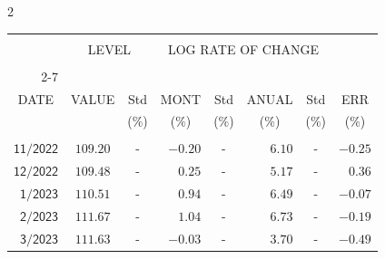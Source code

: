 \begin{multicols}{2}{ 
\begin{tabular}{rccrcrcr} 
\hline 
 \multicolumn{1}{|c|}{}  &  \multicolumn{2}{c|}{} & 
\multicolumn{4}{c}{} & \multicolumn{1}{|c|}{}\vspace{-.10in}\\ 
\multicolumn{1}{|c|}{}  &  \multicolumn{2}{c|}{LEVEL} & 
\multicolumn{4}{c}{LOG RATE OF CHANGE} & \multicolumn{1}{|c|}{}    \\  
\multicolumn{1}{|c|}{}  &  \multicolumn{2}{c|}{} & 
\multicolumn{4}{c}{} & \multicolumn{1}{|c|}{}\vspace{-.10in}\\ \cline{2-7} 
\multicolumn{1}{|c|}{ } &\multicolumn{1}{c|}{ } & \multicolumn{1}{c|}{} & \multicolumn{1}{c|}{} & \multicolumn{1}{c|}{}     & \multicolumn{1}{c|}{} & \multicolumn{1}{c|}{}  & \multicolumn{1}{c|}{}  \vspace{-.05in}\\  
\multicolumn{1}{|c|}{DATE } &\multicolumn{1}{c|}{ VALUE} & \multicolumn{1}{c|}{Std} & \multicolumn{1}{c|}{MONT} & \multicolumn{1}{c|}{Std}     & \multicolumn{1}{c|}{ANUAL} & \multicolumn{1}{c|}{Std}  & \multicolumn{1}{c|}{ERR}\\  
\multicolumn{1}{|c|}{ }      & \multicolumn{1}{c|}{  }    & \multicolumn{1}{c|}{($\%$)}&  \multicolumn{1}{c|}{($\%$)  }  & \multicolumn{1}{c|}{($\%$)} & \multicolumn{1}{c|}{($\%$) }     & \multicolumn{1}{c|}{ ($\%$) }  &  \multicolumn{1}{c|}{ ($\%$) } \\  
 \hline 
 \\$\mathsf{      11/2022}$ &$\mathsf{   109.20}$ &     - &$\mathsf{   -0.20}$ &     - &$\mathsf{     6.10 }$ &     - &$\mathsf{  -0.25} $ \vspace{-.005in}\\ 
$\mathsf{      12/2022}$ &$\mathsf{   109.48}$ &     - &$\mathsf{    0.25}$ &     - &$\mathsf{     5.17 }$ &     - &$\mathsf{   0.36} $ \vspace{-.005in}\\ 
$\mathsf{       1/2023}$ &$\mathsf{   110.51}$ &     - &$\mathsf{    0.94}$ &     - &$\mathsf{     6.49 }$ &     - &$\mathsf{  -0.07} $ \vspace{-.005in}\\ 
$\mathsf{       2/2023}$ &$\mathsf{   111.67}$ &     - &$\mathsf{    1.04}$ &     - &$\mathsf{     6.73 }$ &     - &$\mathsf{  -0.19} $ \vspace{-.005in}\\ 
$\mathsf{       3/2023}$ &$\mathsf{   111.63}$ &     - &$\mathsf{   -0.03}$ &     - &$\mathsf{     3.70 }$ &     - &$\mathsf{  -0.49} $ \vspace{-.005in}\\ 

\end{tabular}}
\end{multicols}
